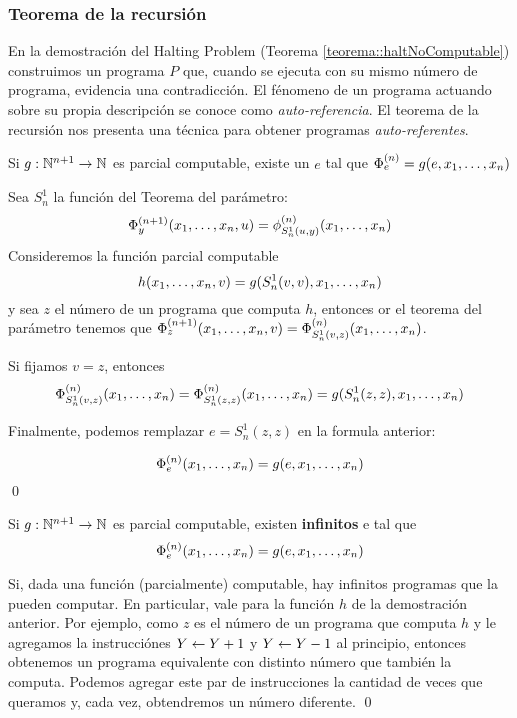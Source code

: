 \subsubsection{Teorema de la recursión}
En la demostración del Halting Problem (Teorema \ref{teorema::haltNoComputable}) construimos un programa $P$ que, cuando se ejecuta con su mismo número de programa, evidencia una contradicción. El fénomeno de un programa actuando sobre su propia descripción se conoce como \textit{auto-referencia}. El teorema de la recursión nos presenta una técnica para obtener programas \textit{auto-referentes}.	

\begin{teorema}\label{teorema::recursion}
	Si $g:\mathbb{N}^{n+1}\to\mathbb{N}$ es parcial computable, existe un $e$ tal que $\Phi_e^{(n)} = g(e,x_1,\dots, x_{n})$
\end{teorema}

\begin{demo}
	Sea $S_n^1$ la función del Teorema del parámetro:
	$$\Phi_y^{(n+1)}(x_1,\dots, x_{n},u) = \phi_{S_n^1(u,y)}^{(n)}(x_1,\dots, x_{n})$$
	Consideremos la función parcial computable $$h(x_1,\dots, x_{n}, v) = g(S_n^1(v,v),x_1,\dots, x_{n})$$ y sea $z$ el número de un programa que computa $h$, entonces or el teorema del parámetro tenemos que $\Phi_z^{(n+1)}(x_1,\dots, x_{n}, v) = \Phi_{S_n^1(v,z)}^{(n)}(x_1,\dots, x_{n})$.
	
	Si fijamos $v = z$, entonces $$\Phi_{S_n^1(v,z)}^{(n)}(x_1,\dots, x_{n}) = \Phi_{S_n^1(z,z)}^{(n)}(x_1,\dots, x_{n}) = g(S_n^1(z,z),x_1,\dots, x_{n})$$
	
	Finalmente, podemos remplazar $e = S_n^1(z,z)$ en la formula anterior:
	
	$$\Phi_{e}^{(n)}(x_1,\dots, x_{n}) = g(e,x_1,\dots, x_{n})$$\qed
\end{demo}

\begin{corolario}\label{corolario::infintosERecursion}
	Si $g:\mathbb{N}^{n+1}\to\mathbb{N}$ es parcial computable, existen \textbf{infinitos} e tal que $$\Phi_e^{(n)}(x_1,\dots, x_{n}) = g(e,x_1,\dots, x_{n})$$
\end{corolario}

\begin{demo}
	Si, dada una función (parcialmente) computable, hay infinitos programas que la pueden computar. En particular, vale para la función $h$ de la demostración anterior. Por ejemplo, como $z$ es el número de un programa que computa $h$ y le agregamos la instrucciónes $Y \leftarrow Y + 1$ y $Y \leftarrow Y - 1$ al principio, entonces obtenemos un programa equivalente con distinto número que también la computa. Podemos agregar este par de instrucciones la cantidad de veces que queramos y, cada vez, obtendremos un número diferente. \qed
\end{demo}
